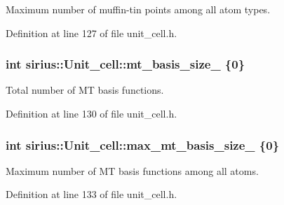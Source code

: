 Maximum number of muffin-\/tin points among all atom types. 



Definition at line 127 of file unit\+\_\+cell.\+h.

\hypertarget{classsirius_1_1_unit__cell_a2e7703e76b4f7e69f58d1678d1f94a01}{}
\subsubsection[{mt\+\_\+basis\+\_\+size\+\_\+}]{\setlength{\rightskip}{0pt plus 5cm}int sirius\+::\+Unit\+\_\+cell\+::mt\+\_\+basis\+\_\+size\+\_\+ \{0\}\hspace{0.3cm}{\ttfamily [private]}}\label{classsirius_1_1_unit__cell_a2e7703e76b4f7e69f58d1678d1f94a01}


Total number of M\+T basis functions. 



Definition at line 130 of file unit\+\_\+cell.\+h.

\hypertarget{classsirius_1_1_unit__cell_ac57f42d865230924812b53f425f627b8}{}
\subsubsection[{max\+\_\+mt\+\_\+basis\+\_\+size\+\_\+}]{\setlength{\rightskip}{0pt plus 5cm}int sirius\+::\+Unit\+\_\+cell\+::max\+\_\+mt\+\_\+basis\+\_\+size\+\_\+ \{0\}\hspace{0.3cm}{\ttfamily [private]}}\label{classsirius_1_1_unit__cell_ac57f42d865230924812b53f425f627b8}


Maximum number of M\+T basis functions among all atoms. 



Definition at line 133 of file unit\+\_\+cell.\+h.

\hypertarget{classsirius_1_1_unit__cell_aeb3c8a1990a2121ffc9feabf9793d1f0}{}
